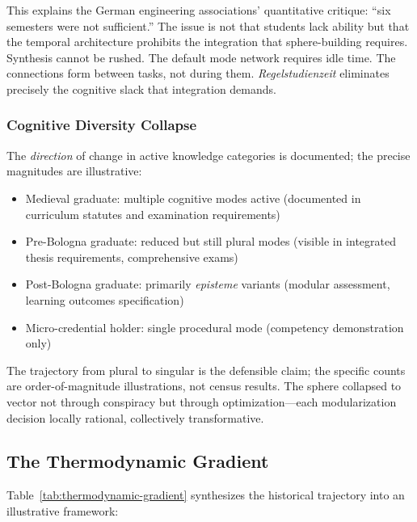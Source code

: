 This explains the German engineering associations' quantitative critique: ``six semesters were not sufficient.'' The issue is not that students lack ability but that the temporal architecture prohibits the integration that sphere-building requires. Synthesis cannot be rushed. The default mode network requires idle time. The connections form between tasks, not during them. \textit{Regelstudienzeit} eliminates precisely the cognitive slack that integration demands.

\subsubsection{Cognitive Diversity Collapse}

The \textit{direction} of change in active knowledge categories is documented; the precise magnitudes are illustrative:

\begin{itemize}
    \item Medieval graduate: multiple cognitive modes active (documented in curriculum statutes and examination requirements)
    \item Pre-Bologna graduate: reduced but still plural modes (visible in integrated thesis requirements, comprehensive exams)
    \item Post-Bologna graduate: primarily \textit{episteme} variants (modular assessment, learning outcomes specification)
    \item Micro-credential holder: single procedural mode (competency demonstration only)
\end{itemize}

The trajectory from plural to singular is the defensible claim; the specific counts are order-of-magnitude illustrations, not census results. The sphere collapsed to vector not through conspiracy but through optimization---each modularization decision locally rational, collectively transformative.

\subsection{The Thermodynamic Gradient}

Table~\ref{tab:thermodynamic-gradient} synthesizes the historical trajectory into an illustrative framework:

